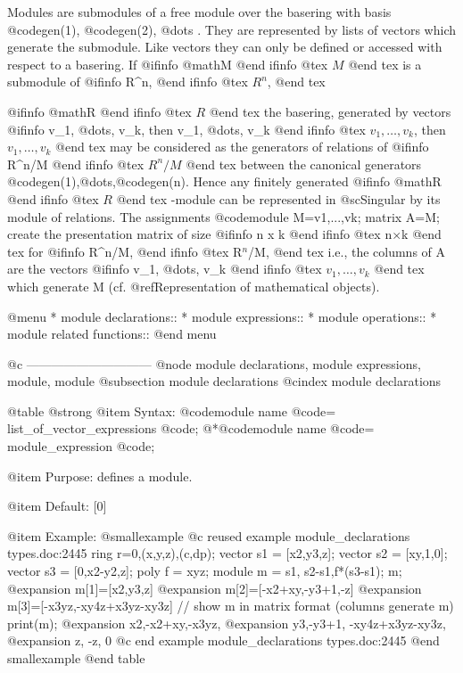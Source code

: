{{{{{{Modules are submodules of a free module over the basering with basis
@code{gen(1)}, @code{gen(2)}, @dots{} .
They are represented by lists of vectors which generate the submodule.
Like vectors they
can only be defined or accessed with respect to a basering.
If 
@ifinfo
@math{M}
@end ifinfo
@tex
$M$
@end tex
 is a submodule of
@ifinfo
R^n,
@end ifinfo
@tex
$R^n$,
@end tex

@ifinfo
@math{R}
@end ifinfo
@tex
$R$
@end tex
 the basering, generated by vectors
@ifinfo
v_1, @dots{}, v_k, then v_1, @dots{}, v_k
@end ifinfo
@tex
$v_1, \ldots, v_k$, then $v_1, \ldots, v_k$
@end tex
may be considered as the generators of relations of
@ifinfo
R^n/M
@end ifinfo
@tex
$R^n/M$
@end tex
between the canonical generators @code{gen(1)},@dots{},@code{gen(n)}.
Hence any finitely generated 
@ifinfo
@math{R}
@end ifinfo
@tex
$R$
@end tex
-module can be represented in @sc{Singular}
by its module of relations. The assignments
@code{module M=v1,...,vk; matrix A=M;}
create the presentation matrix of size
@ifinfo
n x k
@end ifinfo
@tex
n$\times$k
@end tex
 for
@ifinfo
R^n/M,
@end ifinfo
@tex
R$^n$/M,
@end tex
i.e., the columns of A are the vectors
@ifinfo
v_1, @dots{}, v_k
@end ifinfo
@tex
$v_1, \ldots, v_k$
@end tex
which generate M (cf. @ref{Representation of mathematical objects}).

@menu
* module declarations::
* module expressions::
* module operations::
* module related functions::
@end menu

@c ------------------------------
@node module declarations, module expressions, module, module
@subsection module declarations
@cindex module declarations

@table @strong
@item Syntax:
@code{module} name @code{=} list_of_vector_expressions @code{;}
@*@code{module} name @code{=} module_expression @code{;}

@item Purpose:
defines a module.

@item Default:
[0]

@item Example:
@smallexample
@c reused example module_declarations types.doc:2445 
  ring r=0,(x,y,z),(c,dp);
  vector s1 = [x2,y3,z];
  vector s2 = [xy,1,0];
  vector s3 = [0,x2-y2,z];
  poly   f  = xyz;
  module m = s1, s2-s1,f*(s3-s1);
  m;
@expansion{} m[1]=[x2,y3,z]
@expansion{} m[2]=[-x2+xy,-y3+1,-z]
@expansion{} m[3]=[-x3yz,-xy4z+x3yz-xy3z]
  // show m in matrix format (columns generate m)
  print(m);
@expansion{} x2,-x2+xy,-x3yz,          
@expansion{} y3,-y3+1, -xy4z+x3yz-xy3z,
@expansion{} z, -z,    0               
@c end example module_declarations types.doc:2445
@end smallexample
@end table

}}}}}}
